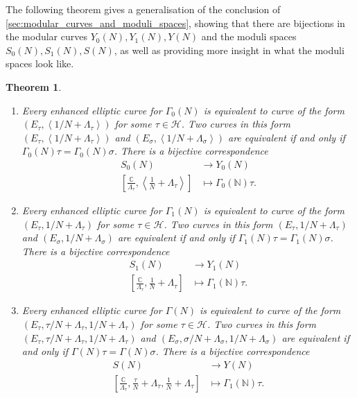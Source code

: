 \documentclass[a4paper]{article}
\theoremstyle{theoremdd}
\newtheorem{theorem}{Theorem}[section]
\theoremstyle{definitiondd}
\theoremstyle{remarkdd}
\newcommand{\N}{\mathbb{N}}
\newcommand{\C}{\mathbb{C}}
\begin{document}
The following theorem gives a generalisation of the conclusion of \cref{sec:modular_curves_and_moduli_spaces}, showing that there are bijections in the modular curves $Y_0(N), Y_1(N), Y(N)$ and the moduli spaces $S_0(N), S_1(N), S(N)$, as well as providing more insight in what the moduli spaces look like. 
\begin{theorem}\label{thm:correspondence_modulispaces}
	\hspace{\linewidth}
	\begin{enumerate}
		\item Every enhanced elliptic curve for $\Gamma_0(N)$ is equivalent to curve of the form $(E_\tau, \left<1 / N + \Lambda_\tau \right>)$ for some $\tau \in \mathcal{H} $. 
			Two curves in this form $(E_\tau, \left<1 / N + \Lambda_\tau \right>)$ and $(E_\sigma, \left<1 / N + \Lambda_\sigma \right>)$ are equivalent if and only if $\Gamma_0\left( N \right) \tau = \Gamma_0(N) \sigma$. There is a bijective correspondence
			\begin{align*}
				S_0(N) &\longrightarrow Y_0(N) \\
				\left[\frac{\C}{\Lambda_\tau}, \left<\frac{1}{N} + \Lambda_\tau \right>\right] &\longmapsto \Gamma_0(\N)\tau
			.\end{align*}
	
		\item Every enhanced elliptic curve for $\Gamma_1(N)$ is equivalent to curve of the form $(E_\tau, 1 / N + \Lambda_\tau )$ for some $\tau \in \mathcal{H} $. 
			Two curves in this form $(E_\tau, 1 / N + \Lambda_\tau )$ and $(E_\sigma, 1 / N + \Lambda_\sigma)$ are equivalent if and only if $\Gamma_1\left( N \right) \tau = \Gamma_1(N) \sigma$. There is a bijective correspondence
			\begin{align*}
				S_1(N) &\longrightarrow Y_1(N) \\
				\left[\frac{\C}{\Lambda_\tau}, \frac{1}{N} + \Lambda_\tau \right] &\longmapsto \Gamma_1(\N)\tau
			.\end{align*}
		\item Every enhanced elliptic curve for $\Gamma(N)$ is equivalent to curve of the form $(E_\tau, \tau / N + \Lambda_\tau, 1 / N + \Lambda_\tau )$ for some $\tau \in \mathcal{H} $. 
			Two curves in this form $(E_\tau, \tau / N + \Lambda_\tau,  1 / N + \Lambda_\tau )$ and $(E_\sigma, \sigma / N + \Lambda_\sigma,1 / N + \Lambda_\sigma)$ are equivalent if and only if $\Gamma\left( N \right) \tau = \Gamma(N) \sigma$. There is a bijective correspondence
			\begin{align*}
				S(N) &\longrightarrow Y(N) \\
				\left[\frac{\C}{\Lambda_\tau}, \frac{\tau}{N} + \Lambda_\tau, \frac{1}{N} + \Lambda_\tau \right] &\longmapsto \Gamma_1(\N)\tau
			.\end{align*}
	\end{enumerate}
\end{theorem}
\end{document}
